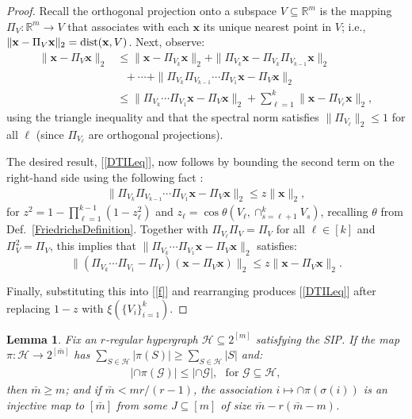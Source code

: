 \documentclass[9pt,twocolumn]{pnas-new}
\newtheorem{lemma}{Lemma}
\renewcommand{\eqref}[1]{\textnormal{[\ref{#1}]}}
\begin{document}
\begin{proof} 
Recall the orthogonal projection onto a subspace $V \subseteq \mathbb{R}^m$ is the mapping $\Pi_V: \mathbb{R}^m \to V$ that associates with each $\mathbf{x}$ its unique nearest point in $V$; i.e., $\|\mathbf{x} - \Pi_V\mathbf{x}\|_2 = \text{\rm dist}(\mathbf{x}, V)$.
Next, observe:
\begin{align}\label{f}
\|\mathbf{x} - \Pi_V\mathbf{x}\|_2 &\leq \|\mathbf{x} - \Pi_{V_k} \mathbf{x}\|_2 + \|\Pi_{V_k}  \mathbf{x} - \Pi_{V_k}\Pi_{V_{k-1}}\mathbf{x}\|_2 \nonumber \\
&\ \ \ + \cdots + \|\Pi_{V_k} \Pi_{V_{k-1}}\cdots \Pi_{V_1} \mathbf{x} - \Pi_V \mathbf{x}\|_2 \nonumber \\
&\leq \|\Pi_{V_k}\cdots\Pi_{V_{1}} \mathbf{x} - \Pi_V \mathbf{x}\|_2 + \sum_{\ell=1}^k \|\mathbf{x} - \Pi_{V_{\ell}} \mathbf{x}\|_2,
\end{align}
using the triangle inequality and that the spectral norm satisfies $\|\Pi_{V_{\ell}}\|_2 \leq 1$ for all $\ell$ (since $\Pi_{V_{\ell}}$ are orthogonal projections).

The desired result, \eqref{DTILeq}, now follows by bounding the second term on the right-hand side using the following fact \cite[Thm.~9.33]{Deutsch12}:
\begin{align}
\|\Pi_{V_k}\Pi_{V_{k-1}}\cdots\Pi_{V_1} \mathbf{x} - \Pi_V\mathbf{x}\|_2 \leq z \|\mathbf{x}\|_2,
\end{align}
for \mbox{$z^2= 1 - \prod_{\ell =1}^{k-1}(1-z_{\ell}^2)$} and \mbox{$z_{\ell} = \cos\theta\left(V_{\ell}, \cap_{s=\ell+1}^k V_s\right)$}, recalling $\theta$ from Def.~\ref{FriedrichsDefinition}. Together with $\Pi_{V_\ell} \Pi_V = \Pi_V$ for all $\ell \in [k]$ and $\Pi_V^2 = \Pi_V$, this implies that $\|\Pi_{V_k} \cdots \Pi_{V_1}\mathbf{x}  - \Pi_V \mathbf{x} \|_2$ satisfies:
\[\| ( \Pi_{V_k} \cdots\Pi_{V_1} - \Pi_V ) (\mathbf{x} - \Pi_V\mathbf{x})\|_2 \leq z\|\mathbf{x} - \Pi_V\mathbf{x}\|_2.\]

Finally, substituting this into \eqref{f} and rearranging produces \eqref{DTILeq} after replacing $1 - z$ with $\xi(\{V_i\}_{i=1}^k)$.
\end{proof}
\begin{lemma}\label{NonEmptyLemma} 
Fix an $r$-regular hypergraph $\mathcal{H} \subseteq 2^{[m]}$ satisfying the SIP. If the map $\pi: \mathcal{H} \to 2^{[\bar m]}$ has $\sum_{S \in \mathcal{H}} |\pi(S)| \geq \sum_{S \in \mathcal{H}} |S|$ and:
\begin{align}\label{cond}
|\cap \pi(\mathcal{G})| \leq |\cap \mathcal{G} |,\ \ \   \text{for } \mathcal{G} \subseteq \mathcal{H},
\end{align}
%
then $\bar m \geq m$; and if $\bar m < mr / (r-1)$, the association $i \mapsto \cap \pi(\sigma(i))$ is an injective map to $[\bar m]$ from some $J \subseteq [m]$ of size $\bar m - r(\bar m - m)$. %
\end{lemma}
\end{document}
